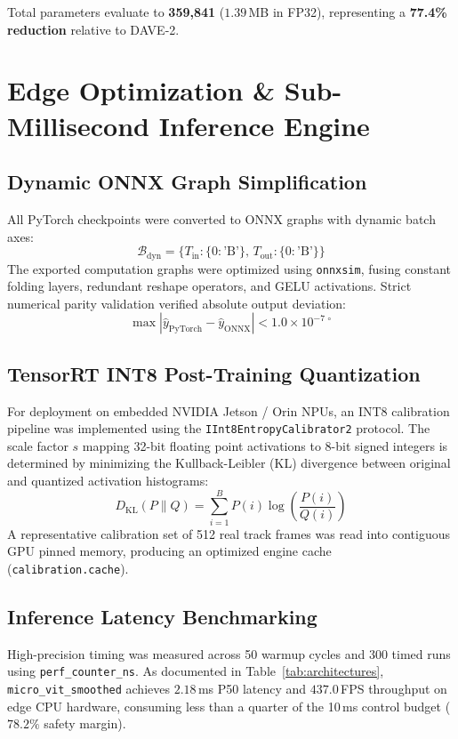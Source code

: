 \documentclass[10pt,journal,compsoc]{IEEEtran}
\begin{document}
Total parameters evaluate to \textbf{359,841} ($1.39$\,MB in FP32), representing a \textbf{77.4\% reduction} relative to DAVE-2.

\section{Edge Optimization \& Sub-Millisecond Inference Engine}

\subsection{Dynamic ONNX Graph Simplification}
All PyTorch checkpoints were converted to ONNX graphs with dynamic batch axes:
\begin{equation}
\mathcal{B}_{\text{dyn}} = \{T_{\text{in}}: \{0: \text{'B'}\}, \, T_{\text{out}}: \{0: \text{'B'}\}\}
\end{equation}
The exported computation graphs were optimized using \texttt{onnxsim}, fusing constant folding layers, redundant reshape operators, and GELU activations. Strict numerical parity validation verified absolute output deviation:
\begin{equation}
\max |\hat{y}_{\text{PyTorch}} - \hat{y}_{\text{ONNX}}| < 1.0 \times 10^{-7\,\circ}
\end{equation}

\subsection{TensorRT INT8 Post-Training Quantization}
For deployment on embedded NVIDIA Jetson / Orin NPUs, an INT8 calibration pipeline was implemented using the \texttt{IInt8EntropyCalibrator2} protocol. The scale factor $s$ mapping 32-bit floating point activations to 8-bit signed integers is determined by minimizing the Kullback-Leibler (KL) divergence between original and quantized activation histograms:
\begin{equation}
D_{\text{KL}}(P \parallel Q) = \sum_{i=1}^{B} P(i) \log \left(\frac{P(i)}{Q(i)}\right)
\end{equation}
A representative calibration set of 512 real track frames was read into contiguous GPU pinned memory, producing an optimized engine cache (\texttt{calibration.cache}).

\subsection{Inference Latency Benchmarking}
High-precision timing was measured across 50 warmup cycles and 300 timed runs using \texttt{perf\_counter\_ns}. As documented in Table~\ref{tab:architectures}, \texttt{micro\_vit\_smoothed} achieves $2.18$\,ms P50 latency and $437.0$\,FPS throughput on edge CPU hardware, consuming less than a quarter of the 10\,ms control budget ($78.2\%$ safety margin).
\end{document}
